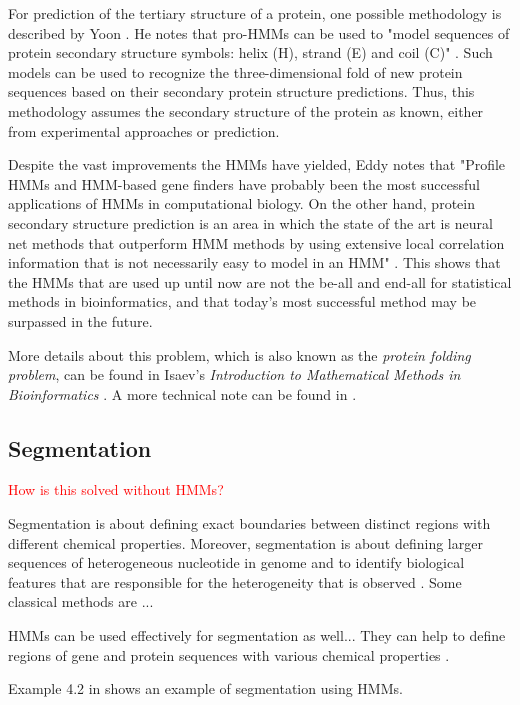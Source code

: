 \documentclass{article}\usepackage[]{graphicx}\usepackage[]{color}
\begin{document}
For prediction of the tertiary structure of a protein, one possible methodology is described by Yoon \cite{Yoon2009}. He notes that pro-HMMs can be used to "model sequences of protein secondary structure symbols: helix (H), strand (E) and coil (C)" \cite{Yoon2009}. Such models can be used to recognize the three-dimensional fold of new protein sequences based on their secondary protein structure predictions. Thus, this methodology assumes the secondary structure of the protein as known, either from experimental approaches or prediction. 

Despite the vast improvements the HMMs have yielded, Eddy notes that "Profile HMMs and HMM-based gene finders have probably been the most successful applications of HMMs in computational biology. On the other hand, protein secondary structure prediction is an area in which the state of the art is neural net methods that outperform HMM methods by using extensive local correlation information that is not necessarily easy to model in an HMM" \cite{Eddy1998}. This shows that the HMMs that are used up until now are not the be-all and end-all for statistical methods in bioinformatics, and that today's most successful method may be surpassed in the future. 

More details about this problem, which is also known as the \textit{protein folding problem}, can be found in Isaev's \textit{Introduction to Mathematical Methods in Bioinformatics} \cite{Isaev2006}. A more technical note can be found in \cite{Choo2004}.

\subsection{Segmentation}

\textcolor{red}{How is this solved without HMMs?}

Segmentation is about defining exact boundaries between distinct regions with different chemical properties. Moreover, segmentation is about defining larger sequences of heterogeneous nucleotide in genome and to identify biological features that are responsible for the heterogeneity that is observed \cite{Christianini2006}. Some classical methods are ...

HMMs can be used effectively for segmentation as well... They can help to define regions of gene and protein sequences with various chemical properties \cite{Christianini2006}. 

Example 4.2 in \cite{Christianini2006} shows an example of segmentation using HMMs.
\end{document}
